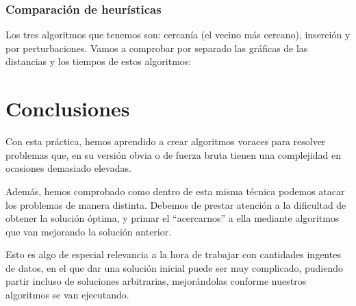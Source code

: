\documentclass[10pt,a4paper]{article}
\begin{document}
\subsubsection{Comparación de heurísticas}

Los tres algoritmos que tenemos son: cercanía (el vecino más cercano), inserción y por perturbaciones. Vamos a comprobar por separado las gráficas de las distancias y los tiempos de estos algoritmos:

\section{Conclusiones}

Con esta práctica, hemos aprendido a crear algoritmos voraces para resolver problemas que, en su versión obvia o de fuerza bruta tienen una complejidad en ocasiones demasiado elevadas.

Además, hemos comprobado como dentro de esta misma técnica podemos atacar los problemas de manera distinta. Debemos de prestar atención a la dificultad de obtener la solución óptima, y primar el ``acercarnos'' a ella mediante algoritmos que van mejorando la solución anterior.

Esto es algo de especial relevancia a la hora de trabajar con cantidades ingentes de datos, en el que dar una solución inicial puede ser muy complicado, pudiendo partir incluso de soluciones arbitrarias, mejorándolas conforme nuestros algoritmos se van ejecutando. 
\end{document}
